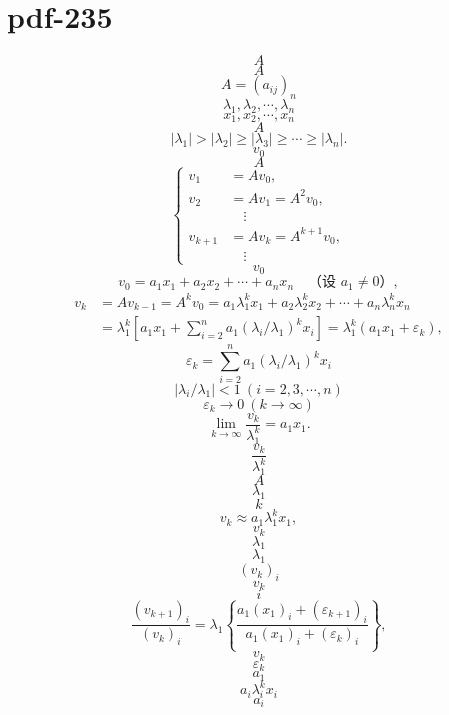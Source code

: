 \documentclass[fontset=fandol]{ctexart}
\begin{document}
\section*{pdf-235}
\[
A
\]
\[
A
\]
\[
A=(a_{ij})_n
\]
\[
\lambda_1,\lambda_2,\cdots,\lambda_n
\]
\[
x_1,x_2,\cdots,x_n
\]
\[
A
\]
\[
|\lambda_1|>|\lambda_2|\geq|\lambda_3|\geq\cdots\geq|\lambda_n|.
\tag{9.2.1}
\]
\[
v_0
\]
\[
A
\]
\[
\left\{
\begin{aligned}
v_1&=Av_0,\\
v_2&=Av_1=A^2v_0,\\
&\quad\vdots\\
v_{k+1}&=Av_k=A^{k+1}v_0,\\
&\quad\vdots
\end{aligned}
\right.
\tag{9.2.2}
\]
\[
v_0
\]
\[
v_0=a_1x_1+a_2x_2+\cdots+a_nx_n\quad\text{（设 }a_1\ne0\text{）},
\tag{9.2.3}
\]
\[
\begin{aligned}
v_k&=Av_{k-1}=A^kv_0=a_1\lambda_1^kx_1+a_2\lambda_2^kx_2+\cdots+a_n\lambda_n^kx_n\\
&=\lambda_1^k\left[a_1x_1+\sum_{i=2}^na_1(\lambda_i/\lambda_1)^kx_i\right]=\lambda_1^k(a_1x_1+\varepsilon_k),
\end{aligned}
\]
\[
\varepsilon_k=\displaystyle\sum_{i=2}^na_1(\lambda_i/\lambda_1)^kx_i
\]
\[
|\lambda_i/\lambda_1|<1\ (i=2,3,\cdots,n)
\]
\[
\varepsilon_k\to0\ (k\to\infty)
\]
\[
\lim_{k\to\infty}\frac{v_k}{\lambda_1^k}=a_1x_1.
\tag{9.2.4}
\]
\[
\dfrac{v_k}{\lambda_1^k}
\]
\[
A
\]
\[
\lambda_1
\]
\[
k
\]
\[
v_k\approx a_1\lambda_1^kx_1,
\tag{9.2.5}
\]
\[
v_k
\]
\[
\lambda_1
\]
\[
\lambda_1
\]
\[
(v_k)_i
\]
\[
v_k
\]
\[
i
\]
\[
\frac{(v_{k+1})_i}{(v_k)_i}=\lambda_1\left\{\frac{a_1(x_1)_i+(\varepsilon_{k+1})_i}{a_1(x_1)_i+(\varepsilon_k)_i}\right\},
\tag{9.2.6}
\]
\[
v_k
\]
\[
\varepsilon_k
\]
\[
a_1
\]
\[
a_i\lambda_i^kx_i
\]
\[
a_i
\]
\end{document}
